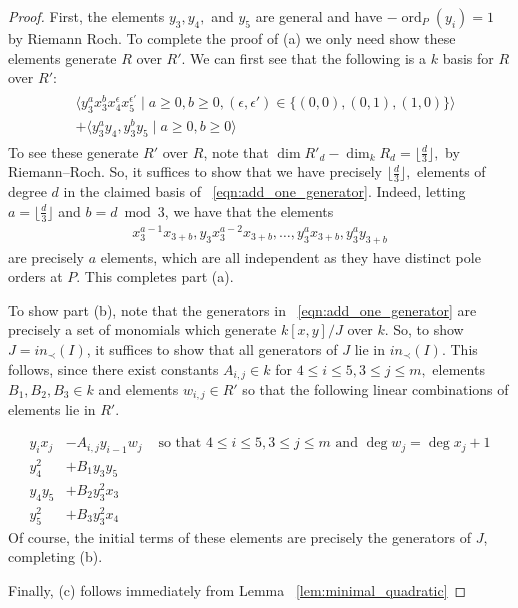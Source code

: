 \documentclass{amsart}
\theoremstyle{plain}
\theoremstyle{definition}
\theoremstyle{remark}
\numberwithin{equation}{section}
\DeclareMathOperator{\ord}{ord}
\begin{document}
\begin{proof}
First, the elements $y_3,y_4,$ and $y_5$ are general and have $-\ord_P(y_i) = 1$ by Riemann Roch.  To complete the proof of (a) we only need show these elements generate $R$ over $R'$. We can first see that the following is a $k$ basis for $R$ over $R'$:
\begin{align}
\label{eqn:add_one_generator}
\begin{split}
	&\langle y_3^ax_3^b x_4^\epsilon x_5^{\epsilon'} \mid a \geq 0, b \geq 0,(\epsilon,\epsilon') \in \{(0,0),(0,1),(1,0)\} \rangle \\
	&+\langle y_3^ay_4,y_3^by_5 \mid a \geq 0, b \geq 0 \rangle
\end{split}
\end{align}
To see these generate $R'$ over $R$, note that $\dim R'_d - \dim_k R_d = \lfloor \frac{d}{3} \rfloor,$ by Riemann--Roch. So, it suffices to show that we have precisely $\lfloor \frac{d}{3} \rfloor,$ elements of degree $d$ in the claimed basis of ~\ref{eqn:add_one_generator}. Indeed, letting $a = \lfloor \frac{d}{3} \rfloor $ and $b = d \bmod 3$, we have that the elements
\begin{align*}
	x_3^{a-1}x_{3+b},y_3x_3^{a-2}x_{3+b},\ldots, y_3^ax_{3+b},y_3^ay_{3+b}
\end{align*}
are precisely $a$ elements, which are all independent as they have distinct pole orders at $P$. This completes part (a).

To show part (b), note that the generators in ~\ref{eqn:add_one_generator} are precisely a set of monomials which generate $k[x,y]/J$ over $k$. So, to show $J = in_\prec(I)$, it suffices to show that all generators of $J$ lie in $in_\prec(I)$. 
This follows, since there exist constants $A_{i,j} \in k$ for $4 \leq i \leq 5,3 \leq j \leq m,$ elements $B_1,B_2,B_3 \in k$ and elements $w_{i,j} \in R'$ so that the following linear combinations of elements lie in $R'$.

\begin{align*}
y_ix_j &- A_{i,j} y_{i-1}w_j & \text{ so that } 4 \leq i \leq 5,3 \leq j \leq m \text{ and } \deg w_j = \deg x_j + 1\\
y_4^2 &+ B_1 y_3 y_5 \\
y_4y_5 &+ B_2 y_3^2 x_3 \\
y_5^2 &+ B_3 y_3^2 x_4
\end{align*}
Of course, the initial terms of these elements are precisely the generators of $J$, completing (b).

Finally, (c) follows immediately from Lemma ~\ref{lem:minimal_quadratic}
\end{proof}
\end{document}

